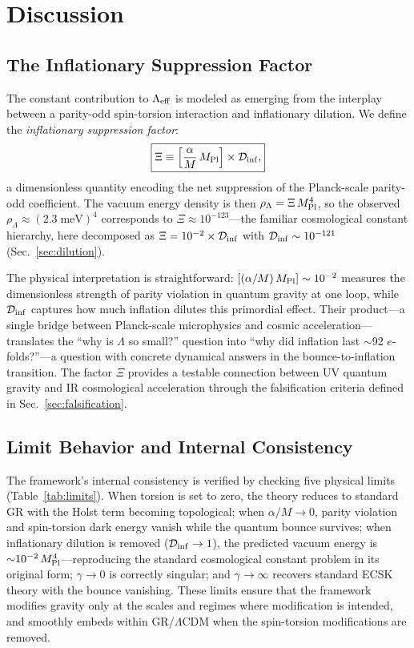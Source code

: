 \documentclass[aps,prd,twocolumn,superscriptaddress,showpacs,preprintnumbers,nofootinbib,longbibliography,floatfix]{revtex4-2}
\newcommand{\Leff}{\Lambda_{\rm eff}}
\newcommand{\Dinf}{\mathcal{D}_{\rm inf}}
\newcommand{\MPl}{M_{\rm Pl}}
\begin{document}
\section{Discussion}\label{sec:discussion}

\subsection{The Inflationary Suppression Factor}\label{sec:gdp}

The constant contribution to $\Leff$ is modeled as emerging from the interplay between a parity-odd spin-torsion interaction and inflationary dilution. We define the \textit{inflationary suppression factor}:
\begin{equation}\label{eq:gdp}
\boxed{\Xi \equiv \left[\frac{\alpha}{M}\,\MPl\right]\times\Dinf,}
\end{equation}
a dimensionless quantity encoding the net suppression of the Planck-scale parity-odd coefficient. The vacuum energy density is then $\rho_\Lambda = \Xi\,\MPl^4$, so the observed $\rho_\Lambda \approx (2.3\;\text{meV})^4$ corresponds to $\Xi\approx 10^{-123}$---the familiar cosmological constant hierarchy, here decomposed as $\Xi = 10^{-2}\times\Dinf$ with $\Dinf\sim 10^{-121}$ (Sec.~\ref{sec:dilution}).

The physical interpretation is straightforward: $[(\alpha/M)\,\MPl]\sim 10^{-2}$ measures the dimensionless strength of parity violation in quantum gravity at one loop, while $\Dinf$ captures how much inflation dilutes this primordial effect. Their product---a single bridge between Planck-scale microphysics and cosmic acceleration---translates the ``why is $\Lambda$ so small?'' question into ``why did inflation last $\sim$92 $e$-folds?''---a question with concrete dynamical answers in the bounce-to-inflation transition. The factor $\Xi$ provides a testable connection between UV quantum gravity and IR cosmological acceleration through the falsification criteria defined in Sec.~\ref{sec:falsification}.

\subsection{Limit Behavior and Internal Consistency}

The framework's internal consistency is verified by checking five physical limits (Table~\ref{tab:limits}). When torsion is set to zero, the theory reduces to standard GR with the Holst term becoming topological; when $\alpha/M \to 0$, parity violation and spin-torsion dark energy vanish while the quantum bounce survives; when inflationary dilution is removed ($\Dinf \to 1$), the predicted vacuum energy is ${\sim}10^{-2}\,\MPl^4$---reproducing the standard cosmological constant problem in its original form; $\gamma \to 0$ is correctly singular; and $\gamma \to \infty$ recovers standard ECSK theory with the bounce vanishing. These limits ensure that the framework modifies gravity only at the scales and regimes where modification is intended, and smoothly embeds within GR/$\Lambda$CDM when the spin-torsion modifications are removed.
\end{document}
